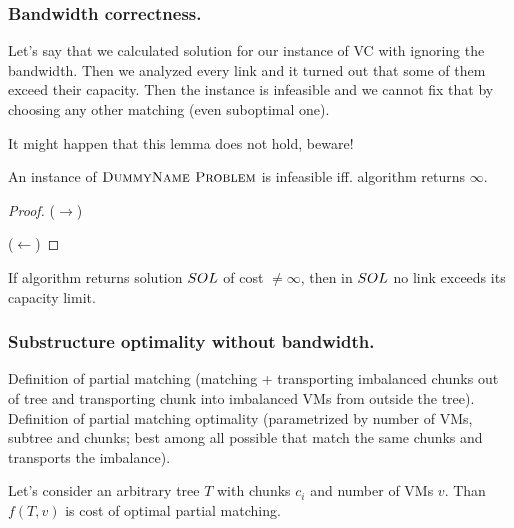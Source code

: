 \subsubsection{Bandwidth correctness.}

\begin{lemma}
Let's say that we calculated solution for our instance of VC with ignoring the bandwidth. Then we analyzed every link and it turned out that some of them exceed their capacity. Then the instance is infeasible and we cannot fix that by choosing any other matching (even suboptimal one).
\end{lemma}

It might happen that this lemma does not hold, beware!

\begin{lemma}
An instance of $\textsc{DummyName Problem}$ is infeasible iff. algorithm returns $\infty$.
\end{lemma}
\begin{proof}
  ($\rightarrow$)

  ($\leftarrow$)
  \end{proof}

\begin{lemma}
  If algorithm returns solution $SOL$ of cost $\neq \infty$, then in $SOL$ no link exceeds its capacity limit.
  \end{lemma}

\subsubsection{Substructure optimality without bandwidth.}

Definition of partial matching (matching + transporting imbalanced chunks out of tree and transporting chunk into imbalanced VMs from outside the tree). Definition of partial matching optimality (parametrized by number of VMs, subtree and chunks; best among all possible that match the same chunks and transports the imbalance).
\begin{lemma}

Let's consider an arbitrary tree $T$ with chunks $c_i$ and number of VMs $v$. Than $f(T, v)$ is cost of optimal partial matching.

\end{lemma}

